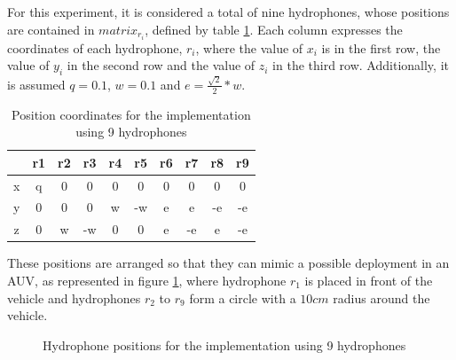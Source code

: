 For this experiment, it is considered a total of nine hydrophones, whose positions are contained in $matrix_{r_{i}}$, defined by table \ref{tab:config-9h}. Each column expresses the coordinates of each hydrophone, $r_i$, where the value of $x_i$ is in the first row, the value of $y_i$ in the second row and the value of $z_i$ in the third row. Additionally, it is assumed $q = 0.1$, $w = 0.1$ and $e = \frac{ \sqrt{2}}{2} * w$.

\begin{table}[!htbp] %
	\begin{center}
		\begin{tabular}{c | c c c c c c c c c}
			\toprule
			& r1 & r2 & r3 & r4	& r5 & r6 & r7 & r8	& r9 \\ \hline 
			\multirow{1}{0.5em}{x} 
			& q & 0 & 0 & 0 & 0 & 0 & 0 & 0 & 0\\
			\midrule 
			\multirow{1}{0.5em}{y} 
			& 0 & 0 & 0 & w & -w & e & e & -e & -e\\
			\midrule 
			\multirow{1}{0.5em}{z} 
			& 0 & w & -w & 0 & 0 & e & -e & e & -e \\
			\bottomrule 
		\end{tabular}
		\caption{Position coordinates for the implementation using 9 hydrophones}
		\label{tab:config-9h}
	\end{center}
\end{table}

These positions are arranged so that they can mimic a possible deployment in an AUV, as represented in figure \ref{fig:9h-config}, where hydrophone $r_1$ is placed in front of the vehicle and hydrophones $r_2$ to $r_9$ form a circle with a $10 cm$ radius around the vehicle.

\begin{figure}[!htbp]
	
	\captionsetup{justification=centering,margin=2cm}
	\caption{Hydrophone positions for the implementation using 9 hydrophones}
	\label{fig:9h-config}
\end{figure}

